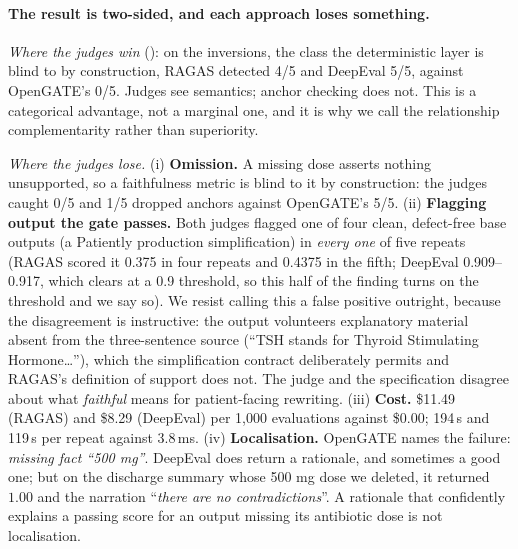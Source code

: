 \documentclass[11pt,a4paper]{article}
\begin{document}
\paragraph{The result is two-sided, and each approach loses something.}
\emph{Where the judges win} (): on the inversions, the class the deterministic
layer is blind to by construction, RAGAS detected 4/5 and DeepEval 5/5, against OpenGATE's 0/5.
Judges see semantics; anchor checking does not. This is a categorical advantage, not a marginal one,
and it is why we call the relationship complementarity rather than superiority.

\emph{Where the judges lose.} (i) \textbf{Omission.} A missing dose asserts nothing unsupported, so a
faithfulness metric is blind to it by construction: the judges caught 0/5 and 1/5 dropped anchors
against OpenGATE's 5/5. (ii) \textbf{Flagging output the gate passes.} Both judges flagged one of four
clean, defect-free base outputs (a Patiently production simplification) in \emph{every one} of five
repeats (RAGAS scored it 0.375 in four repeats and 0.4375 in the fifth; DeepEval 0.909--0.917,
which clears at a 0.9 threshold, so this half of the finding turns on the threshold and we say so). We
resist calling this a false positive outright, because the disagreement is instructive: the output
volunteers explanatory material absent from the three-sentence source (``TSH stands for Thyroid
Stimulating Hormone\ldots''), which the simplification contract deliberately permits and RAGAS's
definition of support does not. The judge and the specification disagree about what \emph{faithful}
means for patient-facing rewriting. (iii) \textbf{Cost.} \$11.49 (RAGAS) and \$8.29 (DeepEval) per
1{,}000 evaluations against \$0.00; 194\,s and 119\,s per repeat against 3.8\,ms. (iv)
\textbf{Localisation.} OpenGATE names the failure: \emph{missing fact ``500 mg''}. DeepEval does
return a rationale, and sometimes a good one; but on the discharge summary whose 500 mg dose we
deleted, it returned $1.00$ and the narration ``\emph{there are no contradictions}''. A rationale that
confidently explains a passing score for an output missing its antibiotic dose is not localisation.
\end{document}
